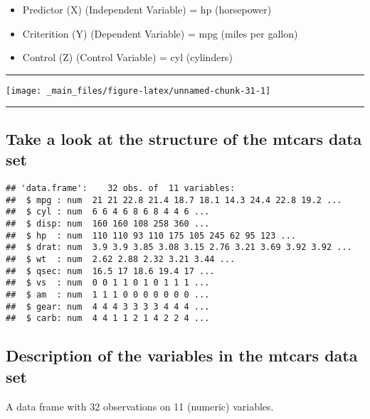 \documentclass[
]{book}
\providecommand{\tightlist}{%
  \setlength{\itemsep}{0pt}\setlength{\parskip}{0pt}}
\theoremstyle{definition}
\theoremstyle{definition}
\theoremstyle{definition}
\theoremstyle{definition}
\theoremstyle{remark}
\begin{document}
\begin{itemize}
\tightlist
\item
  Predictor (X) (Independent Variable) = hp (horsepower)
\item
  Criterition (Y) (Dependent Variable) = mpg (miles per gallon)
\item
  Control (Z) (Control Variable) = cyl (cylinders)
\end{itemize}

\begin{center}\rule{0.5\linewidth}{0.5pt}\end{center}

\texttt{[image: \_main\_files/figure-latex/unnamed-chunk-31-1]}

\begin{center}\rule{0.5\linewidth}{0.5pt}\end{center}

\hypertarget{take-a-look-at-the-structure-of-the-mtcars-data-set}{%
\subsection{Take a look at the structure of the mtcars data set}\label{take-a-look-at-the-structure-of-the-mtcars-data-set}}

\begin{verbatim}
## 'data.frame':    32 obs. of  11 variables:
##  $ mpg : num  21 21 22.8 21.4 18.7 18.1 14.3 24.4 22.8 19.2 ...
##  $ cyl : num  6 6 4 6 8 6 8 4 4 6 ...
##  $ disp: num  160 160 108 258 360 ...
##  $ hp  : num  110 110 93 110 175 105 245 62 95 123 ...
##  $ drat: num  3.9 3.9 3.85 3.08 3.15 2.76 3.21 3.69 3.92 3.92 ...
##  $ wt  : num  2.62 2.88 2.32 3.21 3.44 ...
##  $ qsec: num  16.5 17 18.6 19.4 17 ...
##  $ vs  : num  0 0 1 1 0 1 0 1 1 1 ...
##  $ am  : num  1 1 1 0 0 0 0 0 0 0 ...
##  $ gear: num  4 4 4 3 3 3 3 4 4 4 ...
##  $ carb: num  4 4 1 1 2 1 4 2 2 4 ...
\end{verbatim}

\hypertarget{description-of-the-variables-in-the-mtcars-data-set}{%
\subsection{Description of the variables in the mtcars data set}\label{description-of-the-variables-in-the-mtcars-data-set}}

A data frame with 32 observations on 11 (numeric) variables.
\end{document}
